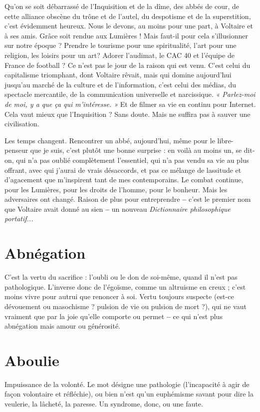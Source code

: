 Qu'on se soit débarrassé de l’Inquisition et de la dîme, des abbés de cour,
de cette alliance obscène du trône et de l’autel, du despotisme et de la superstition,
c’est évidemment heureux. Nous le devons, au moins pour une part, à
Voltaire et à ses amis. Grâce soit rendue aux Lumières ! Mais faut-il pour cela
s’illusionner sur notre époque ? Prendre le tourisme pour une spiritualité, l’art
pour une religion, les loisirs pour un art? Adorer l'audimat, le CAC 40 et
l’équipe de France de football ? Ce n’est pas le jour de la raison qui est venu.
C’est celui du capitalisme triomphant, dont Voltaire rêvait, mais qui domine
aujourd’hui jusqu’au marché de la culture et de l'information, c’est celui des
médias, du spectacle mercantile, de la communication universelle et narcissique.
{\it « Parlez-moi de moi, y a que ça qui m'intéresse. »} Et de filmer sa vie en
continu pour Internet. Cela vaut mieux que l’Inquisition ? Sans doute. Mais
ne suffira pas à sauver une civilisation.

Les temps changent. Rencontrer un abbé, aujourd’hui, même pour le libre-penseur
que je suis, c’est plutôt une bonne surprise : en voilà au moins un, se
dit-on, qui n’a pas oublié complètement l'essentiel, qui n’a pas vendu sa vie au
plus offrant, avec qui j'aurai de vrais désaccords, et pas ce mélange de lassitude
et d’agacement que m'inspirent tant de mes contemporains. Le combat
continue, pour les Lumières, pour les droits de l’homme, pour le bonheur.
Mais les adversaires ont changé. Raison de plus pour entreprendre {\bf --} c'est le
premier nom que Voltaire avait donné au sien {\bf --} un nouveau {\it Dictionnaire philosophique
portatif...}

\section{Abnégation}
C’est la vertu du sacrifice : l'oubli ou le don de soi-même,
quand il n’est pas pathologique. L’inverse donc de l’égoïsme,
comme un altruisme en creux ; c’est moins vivre pour autrui que renoncer à soi.
Vertu toujours suspecte (est-ce dévouement ou masochisme ? pulsion de vie ou
pulsion de mort ?), qui ne vaut vraiment que par la joie qu’elle comporte ou
permet {\bf --} ce qui n’est plus abnégation mais amour ou générosité.

\section{Aboulie}
Impuissance de la volonté. Le mot désigne une pathologie (l'incapacité
à agir de façon volontaire et réfléchie), ou bien n’est
qu’un euphémisme savant pour dire la veulerie, la lâcheté, la paresse. Un syndrome,
donc, ou une faute.

